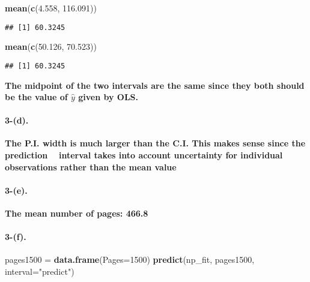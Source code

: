 \documentclass[]{article}
\newenvironment{Shaded}{\begin{snugshade}}{\end{snugshade}}
\newcommand{\KeywordTok}[1]{\textcolor[rgb]{0.13,0.29,0.53}{\textbf{{#1}}}}
\newcommand{\DataTypeTok}[1]{\textcolor[rgb]{0.13,0.29,0.53}{{#1}}}
\newcommand{\DecValTok}[1]{\textcolor[rgb]{0.00,0.00,0.81}{{#1}}}
\newcommand{\FloatTok}[1]{\textcolor[rgb]{0.00,0.00,0.81}{{#1}}}
\newcommand{\StringTok}[1]{\textcolor[rgb]{0.31,0.60,0.02}{{#1}}}
\newcommand{\NormalTok}[1]{{#1}}
\let\oldparagraph\paragraph
\renewcommand{\paragraph}[1]{\oldparagraph{#1}\mbox{}}
\begin{document}
\begin{Shaded}
\begin{Highlighting}[]
\KeywordTok{mean}\NormalTok{(}\KeywordTok{c}\NormalTok{(}\FloatTok{4.558}\NormalTok{, }\FloatTok{116.091}\NormalTok{))}
\end{Highlighting}
\end{Shaded}

\begin{verbatim}
## [1] 60.3245
\end{verbatim}

\begin{Shaded}
\begin{Highlighting}[]
\KeywordTok{mean}\NormalTok{(}\KeywordTok{c}\NormalTok{(}\FloatTok{50.126}\NormalTok{, }\FloatTok{70.523}\NormalTok{))}
\end{Highlighting}
\end{Shaded}

\begin{verbatim}
## [1] 60.3245
\end{verbatim}

\textbf{The midpoint of the two intervals are the same since they both
should be the value of \(\hat{y}\) given by OLS.}

\paragraph{3-(d).}\label{d.}

\textbf{The P.I. width is much larger than the C.I. This makes sense
since the prediction ~ interval takes into account uncertainty for
individual observations rather than the mean value}

\paragraph{3-(e).}\label{e.}

\textbf{The mean number of pages: 466.8}

\paragraph{3-(f).}\label{f.}

\begin{Shaded}
\begin{Highlighting}[]
\NormalTok{pages1500 =}\StringTok{ }\KeywordTok{data.frame}\NormalTok{(}\DataTypeTok{Pages=}\DecValTok{1500}\NormalTok{)}
\KeywordTok{predict}\NormalTok{(np_fit, pages1500, }\DataTypeTok{interval=}\StringTok{"predict"}\NormalTok{)}
\end{Highlighting}
\end{Shaded}
\end{document}
